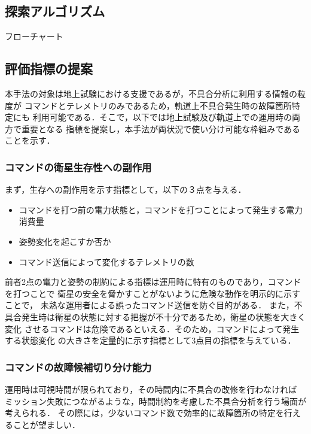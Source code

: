 \documentclass[11pt]{jsarticle}%
\begin{document}
\begin{multicols}{2}

\subsection{探索アルゴリズム}
\vspace{-1zh}
フローチャート

\vspace{-1zh}
\subsection{評価指標の提案}
本手法の対象は地上試験における支援であるが，不具合分析に利用する情報の粒度が
コマンドとテレメトリのみであるため，軌道上不具合発生時の故障箇所特定にも
利用可能である．そこで，以下では地上試験及び軌道上での運用時の両方で重要となる
指標を提案し，本手法が両状況で使い分け可能な枠組みであることを示す．
\vspace{-1zh}
  \subsubsection{コマンドの衛星生存性への副作用}
  まず，生存への副作用を示す指標として，以下の３点を与える．
  \begin{itemize}
    \item コマンドを打つ前の電力状態と，コマンドを打つことによって発生する電力消費量
    \item 姿勢変化を起こすか否か
    \item コマンド送信によって変化するテレメトリの数
  \end{itemize}
  前者2点の電力と姿勢の制約による指標は運用時に特有のものであり，コマンドを打つことで
  衛星の安全を脅かすことがないように危険な動作を明示的に示すことで，
  未熟な運用者による誤ったコマンド送信を防ぐ目的がある．
  また，不具合発生時は衛星の状態に対する把握が不十分であるため，衛星の状態を大きく変化
  させるコマンドは危険であるといえる．そのため，コマンドによって発生する状態変化
  の大きさを定量的に示す指標として3点目の指標を与えている．
\vspace{-1zh}
\subsubsection{コマンドの故障候補切り分け能力}
  運用時は可視時間が限られており，その時間内に不具合の改修を行わなければ
  ミッション失敗につながるような，時間制約を考慮した不具合分析を行う場面が考えられる．
  その際には，少ないコマンド数で効率的に故障箇所の特定を行えることが望ましい．


\end{multicols}
\end{document}
